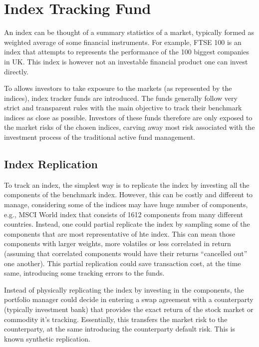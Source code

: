 \section{Index Tracking Fund}
An index can be thought of a summary statistics of a market, typically formed as weighted average of some financial instruments. For example, FTSE 100 is an index that attempts to represents the performance of the 100 biggest companies in UK. This index is however not an investable financial product one can invest directly.
 
To allows investors to take exposure to the markets (as represented by the indices), index tracker funds are introduced. The funds generally follow very strict and transparent rules with the main objective to track their benchmark indices as close as possible. Investors of these funds therefore are only exposed to the market risks of the chosen indices, carving away most risk associated with the investment process of the traditional active fund management.
 
\subsection{Index Replication}
To track an index, the simplest way is to replicate the index by investing all the components of the benchmark index. However, this can be costly and different to manage, considering some of the indices may have huge number of components, e.g., MSCI World index that consists of 1612 components from many different countries. Instead, one could partial replicate the index by sampling some of the components that are most representative of hte index. This can mean those components with larger weights, more volatiles or less correlated in return (assuming that correlated components would have their returns ``cancelled out'' one another). This partial replication could save transaction cost, at the time same, introducing some tracking errors to the funds.
 
Instead of physically replicating the index by investing in the components, the portfolio manager could decide in entering a swap agreement with a counterparty (typically investment bank) that provides the exact return of the stock market or commodity it’s tracking. Essentially, this transfers the market risk to the counterparty, at the same introducing the counterparty default risk. This is known synthetic replication.
 
